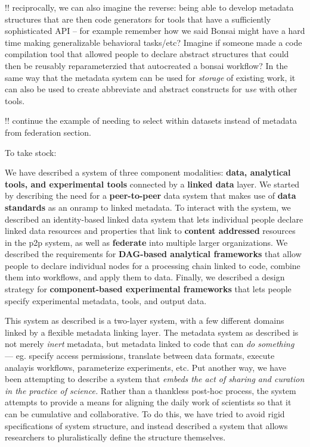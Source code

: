 \documentclass[10pt]{tufte-book}
\begin{document}
!! reciprocally, we can also imagine the reverse: being able to develop
metadata structures that are then code generators for tools that have a
sufficiently sophisticated API -- for example remember how we said
Bonsai might have a hard time making generalizable behavioral tasks/etc?
Imagine if someone made a code compilation tool that allowed people to
declare abstract structures that could then be reusably reparameterzied
that autocreated a bonsai workflow? In the same way that the metadata
system can be used for \emph{storage} of existing work, it can also be
used to create abbreviate and abstract constructs for \emph{use} with
other tools.

!! continue the example of needing to select within datasets instead of
metadata from federation section.

To take stock:

We have described a system of three component modalities: \textbf{data,
analytical tools, and experimental tools} connected by a \textbf{linked
data} layer. We started by describing the need for a
\textbf{peer-to-peer} data system that makes use of \textbf{data
standards} as an onramp to linked metadata. To interact with the system,
we described an identity-based linked data system that lets individual
people declare linked data resources and properties that link to
\textbf{content addressed} resources in the p2p system, as well as
\textbf{federate} into multiple larger organizations. We described the
requirements for \textbf{DAG-based analytical frameworks} that allow
people to declare individual nodes for a processing chain linked to
code, combine them into workflows, and apply them to data. Finally, we
described a design strategy for \textbf{component-based experimental
frameworks} that lets people specify experimental metadata, tools, and
output data.

This system as described is a two-layer system, with a few different
domains linked by a flexible metadata linking layer. The metadata system
as described is not merely \emph{inert} metadata, but metadata linked to
code that can \emph{do something} --- eg. specify access permissions,
translate between data formats, execute analayis workflows, parameterize
experiments, etc. Put another way, we have been attempting to describe a
system that \emph{embeds the act of sharing and curation in the practice
of science.} Rather than a thankless post-hoc process, the system
attempts to provide a means for aligning the daily work of scientists so
that it can be cumulative and collaborative. To do this, we have tried
to avoid rigid specifications of system structure, and instead described
a system that allows researchers to pluralistically define the structure
themselves.
\end{document}
